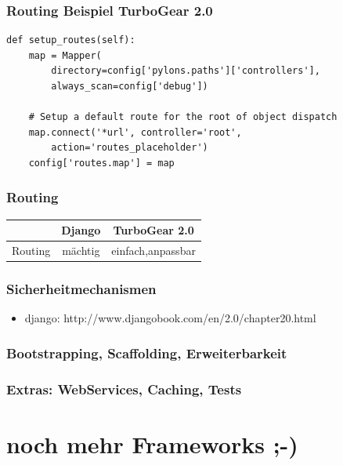 \documentclass[
    t,
    smaller,
    compress,
    xcolor=svgnames,            %
    table,
]{beamer}
\begin{document}
\begin{frame}[fragile]
\frametitle{Routing Beispiel TurboGear 2.0}
\begin{lstlisting}
def setup_routes(self):
    map = Mapper(
        directory=config['pylons.paths']['controllers'],
        always_scan=config['debug'])

    # Setup a default route for the root of object dispatch
    map.connect('*url', controller='root',
        action='routes_placeholder')
    config['routes.map'] = map
\end{lstlisting}
\end{frame}

\begin{frame}
    \frametitle{Routing}

    \begin{table}[h]
        \begin{tabular}{|c|c|c|}
            \hline
             & Django & TurboGear 2.0  \\ \hline
            Routing & \cellcolor{dkgreen} mächtig & \cellcolor{dkgreen} einfach,anpassbar     \\ \hline
         \end{tabular}
    \end{table}
\end{frame}


\begin{frame}
  \frametitle{Sicherheitmechanismen}

  \begin{itemize}[<1->]
    \item django: http://www.djangobook.com/en/2.0/chapter20.html
    \end{itemize}

\end{frame}


\begin{frame}
  \frametitle{Bootstrapping, Scaffolding, Erweiterbarkeit}
\end{frame}


\begin{frame}
  \frametitle{Extras: WebServices, Caching, Tests}
\end{frame}


\section{noch mehr Frameworks ;-)}

\end{document}
